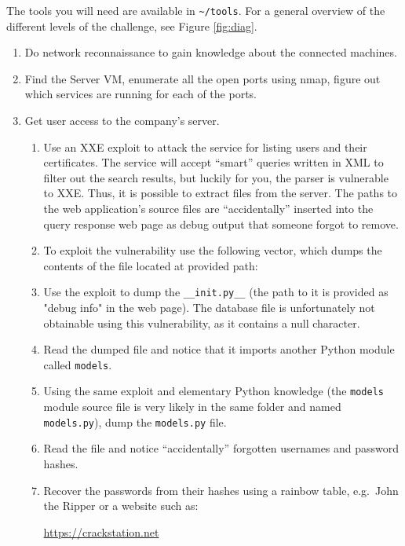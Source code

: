 \documentclass[11pt, a4paper]{article}
\begin{document}
The tools you will need are available in \texttt{\textasciitilde/tools}. For a general overview of the different levels of the challenge, see Figure \ref{fig:diag}.

\begin{enumerate}
  \item Do network reconnaissance to gain knowledge about the connected machines.
  \item Find the Server VM, enumerate all the open ports using nmap, figure
        out which services are running for each of the ports.
  \item Get user access to the company's server.
        \begin{enumerate}
          \item Use an XXE exploit to attack the service for listing users and their certificates.
            The service will accept ``smart'' queries written in XML to filter out
            the search results, but luckily for you, the parser is
            vulnerable to XXE. Thus, it is possible to extract files
            from the server. The paths to the web application's source files
            are ``accidentally'' inserted into the query response web page
            as debug output that someone forgot to remove.
          \item To exploit the vulnerability use the following vector, which
            dumps the contents of the file located at provided path:
            
          \item Use the exploit to dump the \texttt{\_\_init.py\_\_}
            (the path to it is provided as "debug info" in the web page).
            The database file is unfortunately not obtainable using this vulnerability,
            as it contains a null character.
          \item Read the dumped file and notice that it imports another
            Python module called \texttt{models}.
          \item Using the same exploit and elementary Python knowledge
            (the \texttt{models} module source file is very likely in the
            same folder and named \texttt{models.py}), dump the \texttt{models.py} file.
          \item Read the file and notice ``accidentally'' forgotten usernames
            and password hashes.
          \item Recover the passwords from their hashes using a rainbow table, e.g.~John the Ripper or
            a website such as:
            \begin{center} \url{https://crackstation.net} \end{center}
        \end{enumerate}


\end{enumerate}
\end{document}
